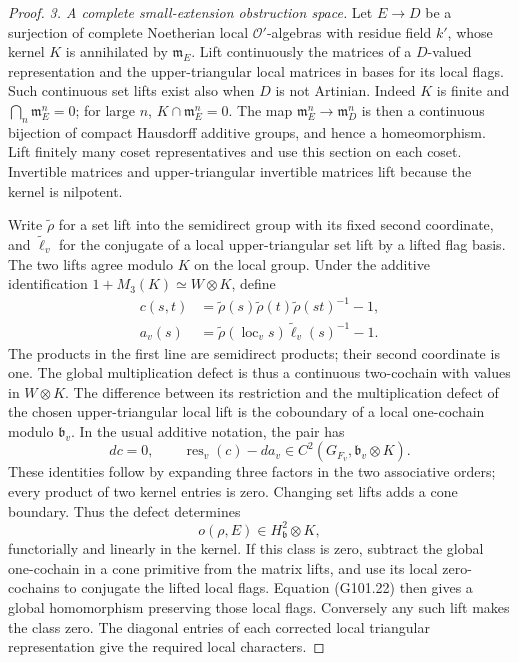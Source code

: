 \begin{proof}
\emph{3. A complete small-extension obstruction space.}
Let \(E\to D\) be a surjection of complete Noetherian local
\(\mathcal O'\)-algebras with residue field \(k'\), whose kernel
\(K\) is annihilated by \(\mathfrak m_E\).
Lift continuously the matrices of a \(D\)-valued representation
and the upper-triangular local matrices in bases for its local flags.
Such continuous set lifts exist also when \(D\) is not Artinian.
Indeed \(K\) is finite and
\(\bigcap_n\mathfrak m_E^n=0\); for large \(n\),
\(K\cap\mathfrak m_E^n=0\).
The map \(\mathfrak m_E^n\to\mathfrak m_D^n\) is then
a continuous bijection of compact Hausdorff additive groups,
and hence a homeomorphism.  Lift finitely many coset
representatives and use this section on each coset.
Invertible matrices and upper-triangular invertible matrices
lift because the kernel is nilpotent.

Write \(\widetilde\rho\) for a set lift into the semidirect
group with its fixed second coordinate, and
\(\widetilde\ell_v\) for the conjugate of a local
upper-triangular set lift by a lifted flag basis.
The two lifts agree modulo \(K\) on the local group.
Under the additive identification
\(1+M_3(K)\simeq W\otimes K\), define
\[
 \begin{split}
 c(s,t)&=\widetilde\rho(s)\widetilde\rho(t)
                       \widetilde\rho(st)^{-1}-1,\\
 a_v(s)&=\widetilde\rho(\operatorname{loc}_v s)
                       \widetilde\ell_v(s)^{-1}-1 .
 \end{split}
 \tag{G101.22a}
\]
The products in the first line are semidirect products; their
second coordinate is one.  The global multiplication defect
is thus a continuous two-cochain with values in \(W\otimes K\).
The difference between its restriction and the multiplication
defect of the chosen upper-triangular local lift is the
coboundary of a local one-cochain modulo \(\mathfrak b_v\).
In the usual additive notation, the pair has
\[
 dc=0,\qquad
       \operatorname{res}_v(c)-da_v
                    \in C^2(G_{F_v},\mathfrak b_v\otimes K).
 \tag{G101.22}
\]
These identities follow by expanding three factors in the two
associative orders; every product of two kernel entries is zero.
Changing set lifts adds a cone boundary.
Thus the defect determines
\[
                         o(\rho,E)\in H^2_{\mathfrak b}\otimes K,
 \tag{G101.23}
\]
functorially and linearly in the kernel.
If this class is zero, subtract the global one-cochain
in a cone primitive from the matrix lifts, and use its local
zero-cochains to conjugate the lifted local flags.
Equation (G101.22) then gives a global homomorphism preserving
those local flags.  Conversely any such lift makes the class zero.
The diagonal entries of each corrected local triangular
representation give the required local characters.


\end{proof}
